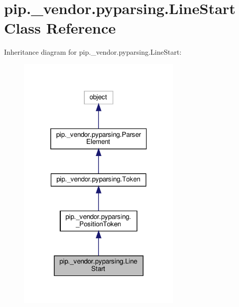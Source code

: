 \hypertarget{classpip_1_1__vendor_1_1pyparsing_1_1LineStart}{}\section{pip.\+\_\+vendor.\+pyparsing.\+Line\+Start Class Reference}
\label{classpip_1_1__vendor_1_1pyparsing_1_1LineStart}


Inheritance diagram for pip.\+\_\+vendor.\+pyparsing.\+Line\+Start\+:
\nopagebreak
\begin{figure}[H]
\begin{center}
\leavevmode
\includegraphics[width=223pt]{classpip_1_1__vendor_1_1pyparsing_1_1LineStart__inherit__graph}
\end{center}
\end{figure}


